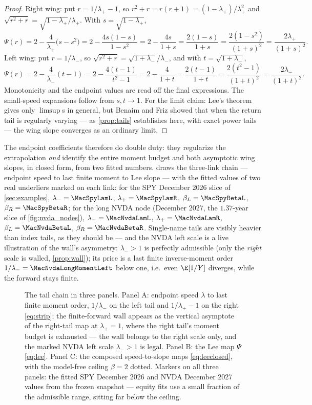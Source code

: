 \begin{proof}
Right wing: put $r=1/\lambda_+-1$, so $r^2+r=r(r+1)=(1-\lambda_+)/\lambda_+^2$
and $\sqrt{r^2+r}=\sqrt{1-\lambda_+}/\lambda_+$.  With
$s=\sqrt{1-\lambda_+}$,
\[
\Psi(r)=2-\frac{4}{\lambda_+}\big(s-s^{2}\big)
=2-\frac{4s(1-s)}{1-s^{2}}
=2-\frac{4s}{1+s}
=\frac{2(1-s)}{1+s}
=\frac{2(1-s^{2})}{(1+s)^{2}}
=\frac{2\lambda_+}{(1+s)^{2}} .
\]
Left wing: put $r=1/\lambda_-$, so $\sqrt{r^2+r}=\sqrt{1+\lambda_-}/\lambda_-$,
and with $t=\sqrt{1+\lambda_-}$,
\[
\Psi(r)=2-\frac{4}{\lambda_-}(t-1)
=2-\frac{4(t-1)}{t^{2}-1}
=2-\frac{4}{1+t}
=\frac{2(t-1)}{1+t}
=\frac{2(t^{2}-1)}{(1+t)^{2}}
=\frac{2\lambda_-}{(1+t)^{2}} .
\]
Monotonicity and the endpoint values are read off the final expressions.
The small-speed expansions follow from $s,t\to1$.  For the limit claim:
Lee's theorem gives only $\limsup$s in general, but Benaim and Friz
\citep{BenaimFriz2009} showed that when the return tail is regularly
varying --- as \cref{prop:tails} establishes here, with exact power tails
--- the wing slope converges as an ordinary limit.
\end{proof}

The endpoint coefficients therefore do double duty: they regularize the
extrapolation \emph{and} identify the entire moment budget and both
asymptotic wing slopes, in closed form, from two fitted numbers.
 draws the three-link chain --- endpoint speed to last
finite moment to Lee slope --- with the fitted values of two real
underliers marked on each link: for the SPY December 2026 slice of
\cref{sec:examples}, $\lambda_-=\MacSpyLamL$, $\lambda_+=\MacSpyLamR$,
$\beta_L=\MacSpyBetaL$, $\beta_R=\MacSpyBetaR$; for the long NVDA node
(December 2027, the $1.37$-year slice of \cref{fig:nvda_nodes}),
$\lambda_-=\MacNvdaLamL$, $\lambda_+=\MacNvdaLamR$,
$\beta_L=\MacNvdaBetaL$, $\beta_R=\MacNvdaBetaR$.  Single-name tails are
visibly heavier than index tails, as they should be --- and the NVDA
left scale is a live illustration of the wall's asymmetry:
$\lambda_->1$ is perfectly admissible (only the \emph{right} scale is
walled, \cref{prop:wall}); its price is a last finite inverse-moment
order $1/\lambda_-=\MacNvdaLongMomentLeft$ below one, i.e.\ even
$\E[1/Y]$ diverges, while the forward stays finite.

\begin{figure}[htbp]
\centering
{}
\caption{The tail chain in three panels.  Panel A: endpoint speed
$\lambda$ to last finite moment order, $1/\lambda_-$ on the left tail and
$1/\lambda_+-1$ on the right \eqref{eq:strip}; the finite-forward wall
appears as the vertical asymptote of the right-tail map at
$\lambda_+=1$, where the right tail's moment budget is exhausted --- the
wall belongs to the right scale only, and the marked NVDA left scale
$\lambda_->1$ is legal.  Panel B: the Lee map $\Psi$ \eqref{eq:lee}.
Panel C: the composed speed-to-slope maps \eqref{eq:leeclosed}, with the
model-free ceiling $\beta=2$ dotted.  Markers on all three panels: the
fitted SPY December 2026 and NVDA December 2027 values from the frozen
snapshot --- equity fits use a small fraction of the admissible range,
sitting far below the ceiling.}
\label{fig:tails}
\end{figure}


